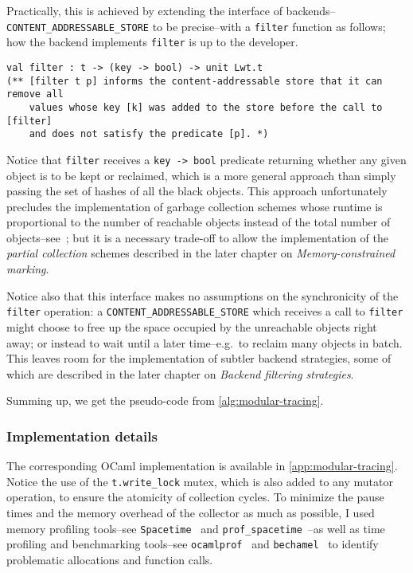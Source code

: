 Practically, this is achieved by extending the interface of backends--\texttt{CONTENT\_ADDRESSABLE\_STORE} to be precise--with a \texttt{filter} function as follows; how the backend implements \texttt{filter} is up to the developer.

\begin{verbatim}
val filter : t -> (key -> bool) -> unit Lwt.t
(** [filter t p] informs the content-addressable store that it can remove all
    values whose key [k] was added to the store before the call to [filter]
    and does not satisfy the predicate [p]. *)
\end{verbatim}

Notice that \texttt{filter} receives a \texttt{key\ -\textgreater{}\ bool} predicate returning whether any given object is to be kept or reclaimed, which is a more general approach than simply passing the set of hashes of all the black objects. This approach unfortunately precludes the implementation of garbage collection schemes whose runtime is proportional to the number of reachable objects instead of the total number of objects--see~\cite{zorn90}; but it is a necessary trade-off to allow the implementation of the \emph{partial collection} schemes described in the later chapter on \emph{Memory-constrained marking}.

Notice also that this interface makes no assumptions on the synchronicity of the \texttt{filter} operation: a \texttt{CONTENT\_ADDRESSABLE\_STORE} which receives a call to \texttt{filter} might choose to free up the space occupied by the unreachable objects right away; or instead to wait until a later time--e.g.~to reclaim many objects in batch. This leaves room for the implementation of subtler backend strategies, some of which are described in the later chapter on \emph{Backend filtering strategies}.

Summing up, we get the pseudo-code from \cref{alg:modular-tracing}.



\subsubsection{Implementation details}

The corresponding OCaml implementation is available in \cref{app:modular-tracing}. Notice the use of the \texttt{t.write\_lock} mutex, which is also added to any mutator operation, to ensure the atomicity of collection cycles. To minimize the pause times and the memory overhead of the collector as much as possible, I used memory profiling tools--see \texttt{Spacetime}~\cite{spacetime} and \texttt{prof\_spacetime}~\cite{prof-spacetime}--as well as time profiling and benchmarking tools--see \texttt{ocamlprof}~\cite{ocamlprof} and \texttt{bechamel}~\cite{bechamel} to identify problematic allocations and function calls.

